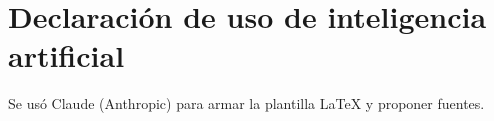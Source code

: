 \documentclass[11pt,a4paper]{article}
\begin{document}
\clearpage
\section*{Declaraci\'on de uso de inteligencia artificial}
\small
Se us\'o Claude (Anthropic) para armar la plantilla LaTeX y proponer fuentes.

\printbibliography[title={Referencias}]
\end{document}
